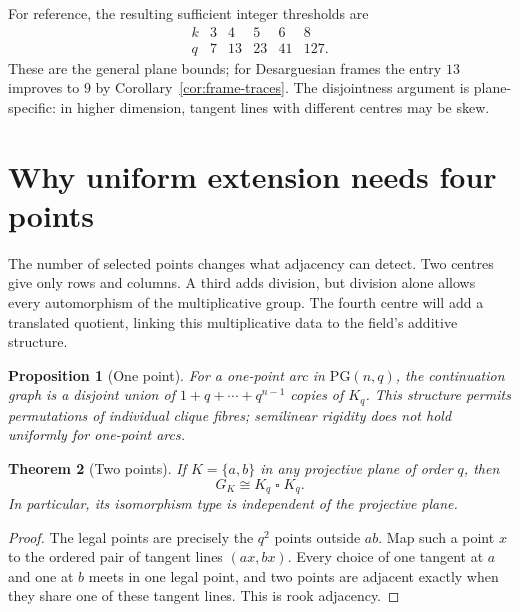 \documentclass[11pt]{article}
\newtheorem{theorem}{Theorem}[section]
\newtheorem{proposition}[theorem]{Proposition}
\theoremstyle{definition}
\theoremstyle{remark}
\newcommand{\PG}{\mathrm{PG}}
\begin{document}
For reference, the resulting sufficient integer thresholds are
\[
\begin{array}{c|ccccc}
k&3&4&5&6&8\\ \hline
q&7&13&23&41&127.
\end{array}
\]
These are the general plane bounds; for Desarguesian frames the entry
$13$ improves to $9$ by Corollary~\ref{cor:frame-traces}.  The disjointness
argument is plane-specific: in higher dimension, tangent lines with
different centres may be skew.

\section{Why uniform extension needs four points}
\label{sec:obstructions}

The number of selected points changes what adjacency can detect. Two
centres give only rows and columns. A third adds division, but division
alone allows every automorphism of the multiplicative group. The fourth
centre will add a translated quotient, linking this multiplicative data
to the field's additive structure.


\begin{proposition}[One point]\label{prop:one-point}
For a one-point arc in $\PG(n,q)$, the continuation graph is a disjoint
union of $1+q+\cdots+q^{n-1}$ copies of $K_q$.  This structure permits permutations of individual clique fibres;
semilinear rigidity does not hold uniformly for one-point arcs.
\end{proposition}

\begin{theorem}[Two points]\label{thm:rook}
If $K=\{a,b\}$ in any projective plane of order $q$, then
\[
  G_K\cong K_q\mathbin{\square}K_q.
\]
In particular, its isomorphism type is independent of the projective plane.
\end{theorem}

\begin{proof}
The legal points are precisely the $q^2$ points outside $ab$.  Map such a
point $x$ to the ordered pair of tangent lines $(ax,bx)$.  Every choice of
one tangent at $a$ and one at $b$ meets in one legal point, and two points
are adjacent exactly when they share one of these tangent lines.  This is
rook adjacency.
\end{proof}
\end{document}
